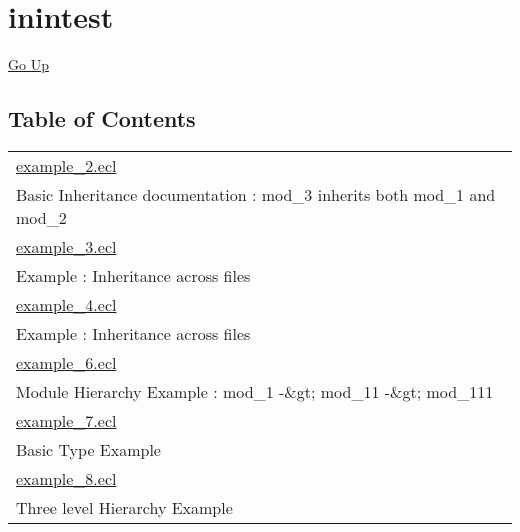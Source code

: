 \chapter*{\color{headtoc} inintest}
\hypertarget{ecldoc:toc:root/intest/inintest}{}
\hyperlink{ecldoc:toc:}{Go Up}


\section*{Table of Contents}
{\renewcommand{\arraystretch}{1.5}
\begin{longtable}{|p{\textwidth}|}
\hline
\hyperlink{ecldoc:toc:intest.inintest.example_2}{example\_2.ecl} \\
Basic Inheritance documentation : mod\_3 inherits both mod\_1 and mod\_2 \\
\hline
\hyperlink{ecldoc:toc:intest.inintest.example_3}{example\_3.ecl} \\
Example : Inheritance across files \\
\hline
\hyperlink{ecldoc:toc:intest.inintest.example_4}{example\_4.ecl} \\
Example : Inheritance across files \\
\hline
\hyperlink{ecldoc:toc:intest.inintest.example_6}{example\_6.ecl} \\
Module Hierarchy Example : mod\_1 -\&gt; mod\_11 -\&gt; mod\_111 \\
\hline
\hyperlink{ecldoc:toc:intest.inintest.example_7}{example\_7.ecl} \\
Basic Type Example \\
\hline
\hyperlink{ecldoc:toc:intest.inintest.example_8}{example\_8.ecl} \\
Three level Hierarchy Example \\
\hline
\end{longtable}
}







